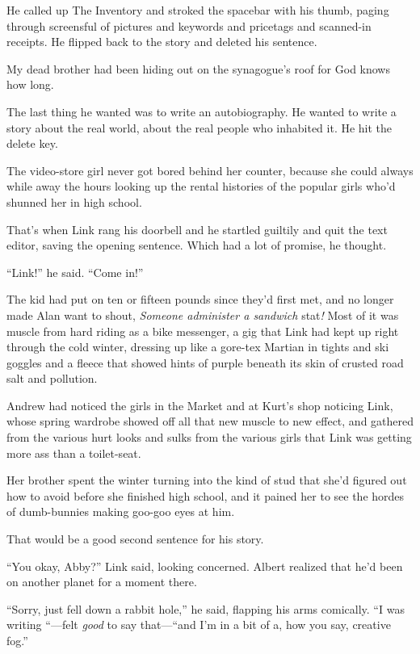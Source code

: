 \documentclass{article}
\begin{document}
He called up The Inventory and stroked the spacebar with his thumb,
paging through screensful of pictures and keywords and pricetags and
scanned-in receipts.  He flipped back to the story and deleted his
sentence.

My dead brother had been hiding out on the synagogue's roof for God
knows how long.

The last thing he wanted was to write an autobiography.  He wanted to
write a story about the real world, about the real people who
inhabited it.  He hit the delete key.

The video-store girl never got bored behind her counter, because she
could always while away the hours looking up the rental histories of
the popular girls who'd shunned her in high school.

That's when Link rang his doorbell and he startled guiltily and quit
the text editor, saving the opening sentence.  Which had a lot of
promise, he thought.

``Link!'' he said.  ``Come in!''

The kid had put on ten or fifteen pounds since they'd first met, and
no longer made Alan want to shout, \textit{Someone administer a
sandwich} stat\textit{!} Most of it was muscle from hard riding as a
bike messenger, a gig that Link had kept up right through the cold
winter, dressing up like a gore-tex Martian in tights and ski goggles
and a fleece that showed hints of purple beneath its skin of crusted
road salt and pollution.

Andrew had noticed the girls in the Market and at Kurt's shop noticing
Link, whose spring wardrobe showed off all that new muscle to new
effect, and gathered from the various hurt looks and sulks from the
various girls that Link was getting more ass than a toilet-seat.

Her brother spent the winter turning into the kind of stud that she'd
figured out how to avoid before she finished high school, and it
pained her to see the hordes of dumb-bunnies making goo-goo eyes at
him.

That would be a good second sentence for his story.

``You okay, Abby?'' Link said, looking concerned.  Albert realized
that he'd been on another planet for a moment there.

``Sorry, just fell down a rabbit hole,'' he said, flapping his arms
comically.  ``I was writing ``---felt \textit{good} to say that---``and
I'm in a bit of a, how you say, creative fog.''
\end{document}
